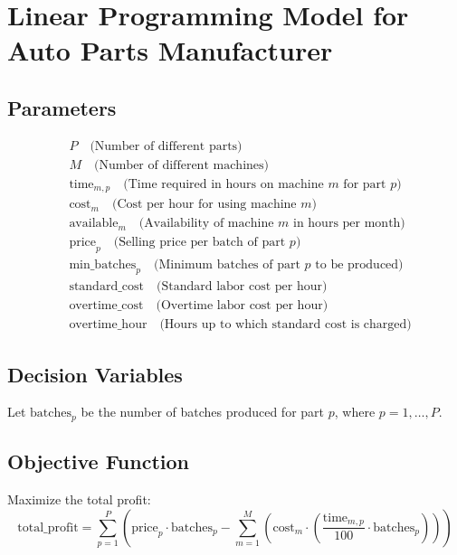 \documentclass{article}
\begin{document}
\section*{Linear Programming Model for Auto Parts Manufacturer}

\subsection*{Parameters}
\begin{align*}
& P \quad \text{(Number of different parts)} \\
& M \quad \text{(Number of different machines)} \\
& \text{time}_{m,p} \quad \text{(Time required in hours on machine } m \text{ for part } p) \\
& \text{cost}_{m} \quad \text{(Cost per hour for using machine } m) \\
& \text{available}_{m} \quad \text{(Availability of machine } m \text{ in hours per month)} \\
& \text{price}_{p} \quad \text{(Selling price per batch of part } p) \\
& \text{min\_batches}_{p} \quad \text{(Minimum batches of part } p \text{ to be produced)} \\
& \text{standard\_cost} \quad \text{(Standard labor cost per hour)} \\
& \text{overtime\_cost} \quad \text{(Overtime labor cost per hour)} \\
& \text{overtime\_hour} \quad \text{(Hours up to which standard cost is charged)}
\end{align*}

\subsection*{Decision Variables}
Let \( \text{batches}_{p} \) be the number of batches produced for part \( p \), where \( p = 1, \ldots, P \).

\subsection*{Objective Function}
Maximize the total profit:
\[
\text{total\_profit} = \sum_{p=1}^{P} \left( \text{price}_{p} \cdot \text{batches}_{p} - \sum_{m=1}^{M} \left( \text{cost}_{m} \cdot \left( \frac{\text{time}_{m,p}}{100} \cdot \text{batches}_{p} \right) \right) \right)
\]
\end{document}

